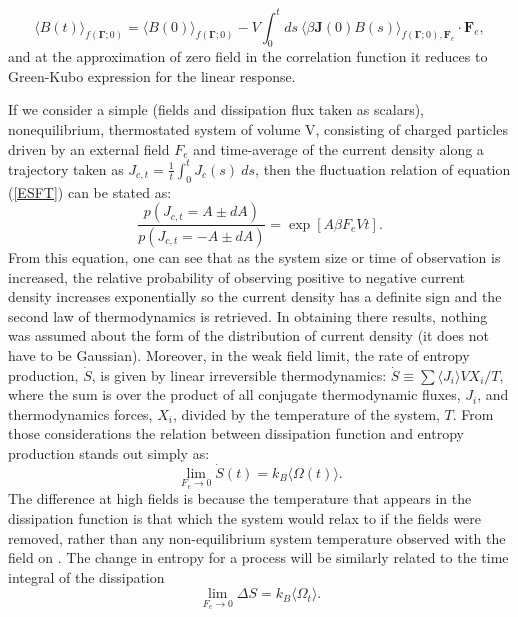 \documentclass[a4paper,12pt]{article}
\begin{document}
\begin{equation}
  \langle B(t) \rangle_{f(\bm{\Gamma};0)}=\langle B(0) \rangle_{f(\bm{\Gamma};0)} - V \int_0^t ds\ \langle \beta \bm{J}(0)B(s)\rangle_{f(\bm{\Gamma};0),\bm{F}_e} \cdot \bm{F}_e,
\end{equation}
and at the approximation of zero field in the correlation function it reduces to Green-Kubo expression for the linear response.


If we consider a simple (fields and dissipation flux taken as scalars), nonequilibrium, thermostated system of volume V, consisting of charged particles driven by an external field $F_e$ and time-average of the current density along a trajectory taken as $J_{c,t}= \frac{1}{t}\int_0^t J_c(s)\ ds$, then the fluctuation relation of equation (\ref{ESFT}) can be stated as:
\begin{equation}
  \frac{p(J_{c,t}=A\pm dA)}{p(J_{c,t}=-A\pm dA)}= \exp[A \beta F_e V t].
\end{equation}
From this equation, one can see that as the system size or time of observation is increased, the relative probability of observing positive to negative current density increases exponentially so the current density has a definite sign and the second law of thermodynamics is retrieved. In obtaining there results, nothing was assumed about the form of the distribution of current density (it does not have to be Gaussian). Moreover, in the weak field limit, the rate of entropy production, $\dot{S}$, is given by linear irreversible thermodynamics: $\dot{S} \equiv \sum \langle J_i \rangle V X_i/T$, where the sum is over the product of all conjugate thermodynamic fluxes, $J_i$, and thermodynamics forces, $X_i$, divided by the temperature of the system, $T$. From those considerations the relation between dissipation function and entropy production stands out simply as:
\begin{equation}
  \lim_{F_e \to 0} \dot{S}(t) = k_B \langle \Omega(t) \rangle.
\end{equation}
The difference at high fields is because the temperature that appears in the dissipation function is that which the system would relax to if the fields were removed, rather than any non-equilibrium system temperature observed with the field on \cite{Evans:2241458}. The change in entropy for a process will be similarly related to the time integral of the dissipation
\begin{equation}
  \lim_{F_e \to 0} \Delta S= k_B \langle \Omega_t \rangle.
\end{equation}
\end{document}
